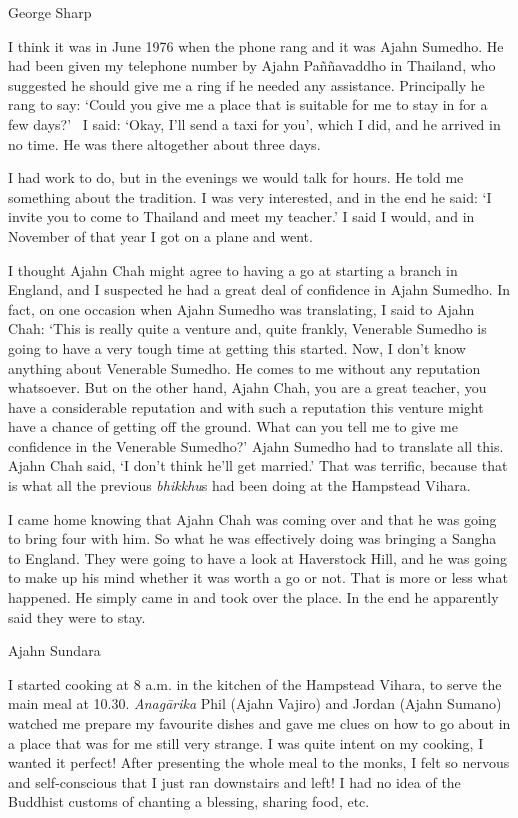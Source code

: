 George Sharp

I think it was in June 1976 when the phone rang and it was Ajahn
Sumedho. He had been given my telephone number by Ajahn Paññavaddho in
Thailand, who suggested he should give me a ring if he needed any
assistance. Principally he rang to say: `Could you give me a place that
is suitable for me to stay in for a few days?'~ I said: `Okay, I'll send
a taxi for you', which I did, and he arrived in no time. He was there
altogether about three days. ~

I had work to do, but in the evenings we would talk for hours. He told
me something about the tradition. I was very interested, and in the end
he said: `I invite you to come to Thailand and meet my teacher.' I said
I would, and in November of that year I got on a plane and went.

I thought Ajahn Chah might agree to having a go at starting a branch in
England, and I suspected he had a great deal of confidence in Ajahn
Sumedho. In fact, on one occasion when Ajahn Sumedho was translating, I
said to Ajahn Chah: `This is really quite a venture and, quite frankly,
Venerable Sumedho is going to have a very tough time at getting this
started. Now, I don't know anything about Venerable Sumedho. He comes to
me without any reputation whatsoever. But on the other hand, Ajahn Chah,
you are a great teacher, you have a considerable reputation and with
such a reputation this venture might have a chance of getting off the
ground. What can you tell me to give me confidence in the Venerable
Sumedho?' Ajahn Sumedho had to translate all this. Ajahn Chah said, `I
don't think he'll get married.' That was terrific, because that is what
all the previous \emph{bhikkhu}s had been doing at the Hampstead Vihara.

I came home knowing that Ajahn Chah was coming over and that he was
going to bring four with him. So what he was effectively doing was
bringing a Sangha to England. They were going to have a look at
Haverstock Hill, and he was going to make up his mind whether it was
worth a go or not. That is more or less what happened. He simply came in
and took over the place. In the end he apparently said they were to
stay.

Ajahn Sundara

I started cooking at 8 a.m. in the kitchen of the Hampstead Vihara, to
serve the main meal at 10.30. \emph{Anagārika} Phil (Ajahn Vajiro) and
Jordan (Ajahn Sumano) watched me prepare my favourite dishes and gave me
clues on how to go about in a place that was for me still very strange.
I was quite intent on my cooking, I wanted it perfect! After presenting
the whole meal to the monks, I felt so nervous and self-conscious that I
just ran downstairs and left! I had no idea of the Buddhist customs of
chanting a blessing, sharing food, etc.

